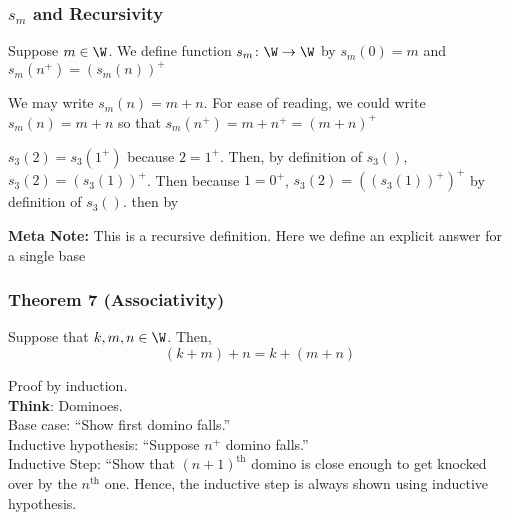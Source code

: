     \vspace{0.5cm}

        \subsubsection{$s_m$ and Recursivity}

            \begin{definition}
                Suppose $m\in \W$. We define function $s_m \colon \W \rightarrow \W$ by $s_m(0) = m$ and $s_m(n^+) = (s_m(n))^+$
            \end{definition}
    
            \begin{notation}
                We may write $s_m(n) = m + n$. For ease of reading, we could write $s_m(n) = m + n$ so that $s_m(n^+) = m + n^+ = (m + n)^+$
            \end{notation}

        \begin{example}
            $s_3(2) = s_3(1^+)$ because $2=1^+$. Then, by definition of $s_3()$, $s_3(2) = (s_3(1))^+$. Then because $1 = 0^+$, $s_3(2) = ((s_3(1))^+)^+$ by definition of $s_3()$. then by 
        \end{example}

        \textbf{Meta Note:} This is a recursive definition. Here we define an explicit answer for a single base 


        \subsubsection{Theorem 7 (Associativity)}

            \begin{ntheorem}
                Suppose that $k,m,n\in \W$. Then, $$(k+m) + n = k + (m + n)$$
            \end{ntheorem}
            
            Proof by induction. \\
            \textbf{Think}: Dominoes. \\
            Base case: ``Show first domino falls.'' \\
            Inductive hypothesis: ``Suppose $n^+$ domino falls.'' \\
            Inductive Step: ``Show that $(n+1)^{\text{th}}$ domino is close enough to get knocked over by the $n^{\text{th}}$ one. Hence, the inductive step is always shown using inductive hypothesis.
            
